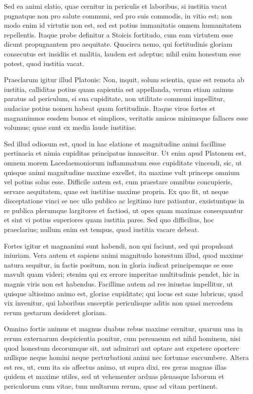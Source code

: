  Sed ea animi elatio, quae cernitur in periculis et laboribus, si iustitia vacat pugnatque non pro salute communi, sed pro suis commodis, in vitio est; non modo enim id virtutis non est, sed est potius immanitatis omnem humanitatem repellentis. Itaque probe definitur a Stoicis fortitudo, cum eam virtutem esse dicunt propugnantem pro aequitate. Quocirca nemo, qui fortitudinis gloriam consecutus est insidiis et malitia, laudem est adeptus; nihil enim honestum esse potest, quod iustitia vacat.

 Praeclarum igitur illud Platonis: Non, inquit, solum scientia, quae est remota ab iustitia, calliditas potius quam sapientia est appellanda, verum etiam animus paratus ad periculum, si sua cupiditate, non utilitate communi impellitur, audaciae potius nomen habeat quam fortitudinis. Itaque viros fortes et magnanimnos eosdem bonos et simplices, veritatis amicos minimeque fallaces esse volumus; quae sunt ex media laude iustitiae.

 Sed illud odiosum est, quod in hac elatione et magnitudine animi facillime pertinacia et nimia cupiditas principatus innascitur. Ut enim apud Platonem est, omnem morem Lacedaemoniorum inflammatum esse cupiditate vincendi, sic, ut quisque animi magnitudine maxime excellet, ita maxime vult princeps omnium vel potius solus esse. Difficile autem est, cum praestare omnibus concupieris, servare aequitatem, quae est iustitiae maxime propria. Ex quo fit, ut neque disceptatione vinci se nec ullo publico ac legitimo iure patiantur, exsistuntque in re publica plerumque largitores et factiosi, ut opes quam maximas consequantur et sint vi potius superiores quam iustitia pares. Sed quo difficilius, hoc praeclarius; nullum enim est tempus, quod iustitia vacare debeat.

 Fortes igitur et magnanimi sunt habendi, non qui faciunt, sed qui propulsant iniuriam. Vera autem et sapiens animi magnitudo honestum illud, quod maxime natura sequitur, in factis positum, non in gloria iudicat principemque se esse mavult quam videri; etenim qui ex errore imperitae multitudinis pendet, hic in magnis viris non est habendus. Facillime autem ad res iniustas impellitur, ut quisque altissimo animo est, gloriae cupiditate; qui locus est sane lubricus, quod vix invenitur, qui laboribus susceptis periculisque aditis non quasi mercedem rerum gestarum desideret gloriam.

 Omnino fortis animus et magnus duabus rebus maxime cernitur, quarum una in rerum externarum despicientia ponitur, cum persuasum est nihil hominem, nisi quod honestum decorumque sit, aut admirari aut optare aut expetere oportere nullique neque homini neque perturbationi animi nec fortunae succumbere. Altera est res, ut, cum ita sis affectus animo, ut supra dixi, res geras magnas illas quidem et maxime utiles, sed ut vehementer arduas plenasque laborum et periculorum cum vitae, tum multarum rerum, quae ad vitam pertinent.

